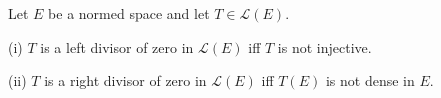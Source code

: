 Let $E$ be a normed space and let $T \in \mathcal{L}(E)$.

(i) $T$ is a left divisor of zero in $\mathcal{L}(E)$ iff $T$ is not injective.

(ii) $T$ is a right divisor of zero in $\mathcal{L}(E)$ iff $T(E)$ is not dense in $E$.
